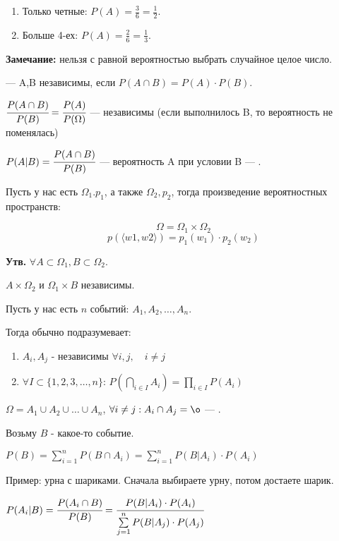 \begin{enumerate}
\item Только четные: $P(A) = \frac{3}{6}=\frac{1}{2}$.
\item Больше 4-ех: $P(A) = \frac{2}{6}=\frac{1}{3}$.
\end{enumerate}

\textbf{Замечание:} нельзя с равной вероятностью выбрать случайное целое число. 

 --- A,B независимы, если $P(A \cap B) = P(A) \cdot P(B)$.

$\cfrac{P(A \cap B)}{ P(B)}  = \cfrac{P(A)}{P(\Omega)}$ --- независимы (если выполнилось B, то вероятность не поменялась)

$P(A | B) = \cfrac{P(A \cap B)}{P(B)}$ --- вероятность A при условии B ---
.


Пусть у нас есть $\Omega_1. p_1$, а также $\Omega_2,p_2$, тогда произведение вероятностных пространств:

\[\Omega = \Omega_1 \times \Omega_2\] \[p(\langle w1,w2\rangle) = p_1(w_1) \cdot p_2(w_2)\]

\textbf{Утв.} $\forall A \subset \Omega_1, B \subset \Omega_2$.

$A \times \Omega_2$ и $\Omega_1 \times B$  независимы.

Пусть у нас есть $n$ событий: $A_1, A_2, \ldots, A_n$.

Тогда обычно  подразумевает:

\begin{enumerate}
    \item $A_i, A_j $ - независимы $\forall i,j, \quad i \ne j$
    \item $\forall I \subset \{1,2,3,\ldots, n\}$: $P(\bigcap\limits_{i \in I }A_i) = \prod\limits_{i \in I} P(A_i)$
\end{enumerate}


$\Omega = A_1 \cup A_2 \cup \ldots \cup A_n $, $\forall i \neq j: A_i \cap A_j = \o$ --- .

Возьму $B$ - какое-то событие.

$P(B) = \sum\limits_{i=1}^n P(B \cap A_i) =  \sum\limits_{i=1}^n P(B| A_i) \cdot P(A_i)$

Пример: урна с шариками. Сначала выбираете урну, потом достаете шарик.


$P(A_i | B) = \cfrac{P(A_i\cap B)}{P(B)} = \cfrac{P(B| A_i) \cdot P(A_i)}{\sum\limits_{j=1}^n P(B| A_j) \cdot P(A_j)}$
